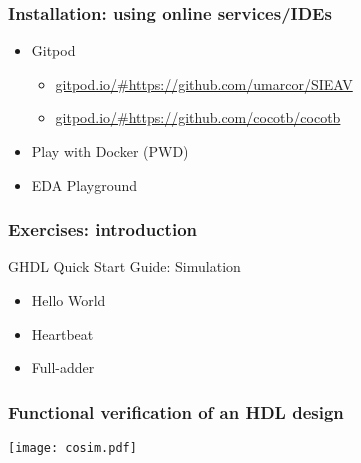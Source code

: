 \documentclass[xcolor={usenames,dvipsnames,svgnames}]{beamer}
\begin{document}
\begin{frame}
\frametitle{Installation: using online services/IDEs}
\vfill
\begin{itemize}
\item Gitpod \href{https://gitpod.io}{\faGlobe}
  \begin{itemize}
    \item \href{https://gitpod.io/\#https://github.com/umarcor/SIEAV}{gitpod.io/\#https://github.com/umarcor/SIEAV}
    \item \href{https://gitpod.io/\#https://github.com/cocotb/cocotb}{gitpod.io/\#https://github.com/cocotb/cocotb}
  \end{itemize}

\vfill

\item Play with Docker (PWD) \href{https://labs.play-with-docker.com/}{\faGlobe}

\vfill

\item EDA Playground \href{https://www.edaplayground.com/}{\faGlobe}

\end{itemize}
\vfill
\end{frame}

\begin{frame}
\frametitle{Exercises: introduction}
\vfill
\begin{center}
GHDL Quick Start Guide: Simulation \href{https://ghdl.github.io/ghdl/quick_start/simulation}{\faBook}
\end{center}
\vfill
\begin{itemize}
  \item Hello World
  \href{https://ghdl.github.io/ghdl/quick_start/simulation/hello}{\faBook}

  \vfill

  \item Heartbeat
  \href{https://ghdl.github.io/ghdl/quick_start/simulation/heartbeat}{\faBook}

  \vfill

  \item Full-adder
  \href{https://ghdl.github.io/ghdl/quick_start/simulation/adder}{\faBook}
\end{itemize}
\vfill
\end{frame}

\begin{frame}
\frametitle{Functional verification of an HDL design}
\centering
\texttt{[image: cosim.pdf]}
\end{frame}
\end{document}
